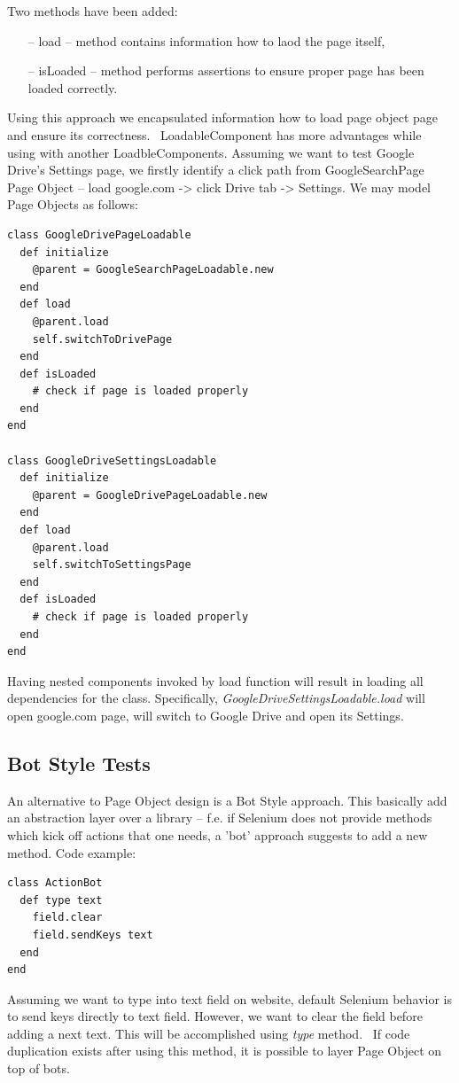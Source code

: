 \documentclass[12pt,twoside]{article}
\begin{document}
Two methods have been added:
\begin{itemize}
\item [--] load -- method contains information how to laod the page itself,
\item [--] isLoaded -- method performs assertions to ensure proper page has been loaded correctly.
\end{itemize}
Using this approach we encapsulated information how to load page object page and ensure its correctness. \
LoadableComponent has more advantages while using with another LoadbleComponents. Assuming we want to test Google Drive's Settings page, we firstly identify a click path from GoogleSearchPage Page Object -- load google.com -> click Drive tab -> Settings.
We may model Page Objects as follows:
\begin{verbatim}
class GoogleDrivePageLoadable 
  def initialize
    @parent = GoogleSearchPageLoadable.new
  end
  def load
    @parent.load
    self.switchToDrivePage
  end 
  def isLoaded
    # check if page is loaded properly
  end
end

class GoogleDriveSettingsLoadable
  def initialize 
    @parent = GoogleDrivePageLoadable.new
  end
  def load 
    @parent.load
    self.switchToSettingsPage
  end 
  def isLoaded
    # check if page is loaded properly  
  end
end
\end{verbatim}

Having nested components invoked by load function will result in loading all dependencies for the class. Specifically, \emph{GoogleDriveSettingsLoadable.load} will open google.com page, will switch to Google Drive and open its Settings.

\subsection{Bot Style Tests}
An alternative to Page Object design is a Bot Style approach. This basically add an abstraction layer over a library -- f.e. if Selenium does not provide methods which kick off actions that one needs, a 'bot' approach suggests to add a new method. Code example:
\begin{verbatim}
class ActionBot
  def type text
    field.clear
    field.sendKeys text
  end
end
\end{verbatim} 
Assuming we want to type into text field on website, default Selenium behavior is to send keys directly to text field. However, we want to clear the field before adding a next text. This will be accomplished using \emph{type} method. \
If code duplication exists after using this method, it is possible to layer Page Object on top of bots.
\end{document}
